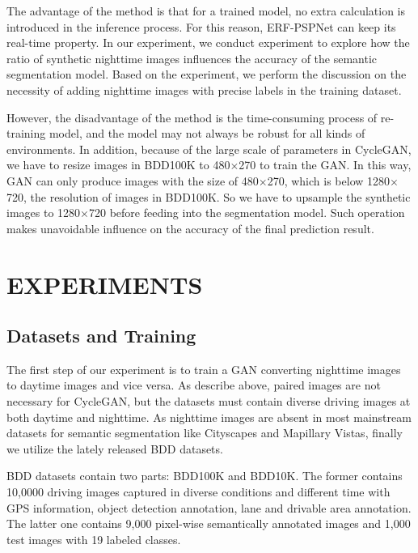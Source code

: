 \documentclass[a4paper]{spie}
\begin{document}
The advantage of the method is that for a trained model, no extra calculation is introduced in the inference process. For this reason, ERF-PSPNet can keep its real-time property. In our experiment, we conduct experiment to explore how the ratio of synthetic nighttime images influences the accuracy of the semantic segmentation model. Based on the experiment, we perform the discussion on the necessity of adding nighttime images with precise labels in the training dataset.


However, the disadvantage of the method is the time-consuming process of re-training model, and the model may not always be robust for all kinds of environments. In addition, because of the large scale of parameters in CycleGAN, we have to resize images in BDD100K to 480$\times$270 to train the GAN. In this way, GAN can only produce images with the size of 480$\times$270, which is below 1280$\times$720, the resolution of images in BDD100K. So we have to upsample the synthetic images to 1280$\times$720 before feeding into the segmentation model. Such operation makes unavoidable influence on the accuracy of the final prediction result.

\section{EXPERIMENTS}

\subsection{Datasets and Training}

The first step of our experiment is to train a GAN converting nighttime images to daytime images and vice versa. As describe above, paired images are not necessary for CycleGAN\cite{zhu2017unpaired}, but the datasets must contain diverse driving images at both daytime and nighttime. As nighttime images are absent in most mainstream datasets for semantic segmentation like Cityscapes\cite{cordts2016cityscapes} and Mapillary Vistas\cite{neuhold2017mapillary}, finally we utilize the lately released BDD datasets\cite{yu2018bdd100k}. 

BDD datasets contain two parts: BDD100K and BDD10K. The former contains 10,0000 driving images captured in diverse conditions and different time with GPS information, object detection annotation, lane and drivable area annotation. The latter one contains 9,000 pixel-wise semantically annotated images and 1,000 test images with 19 labeled classes.
\end{document}
